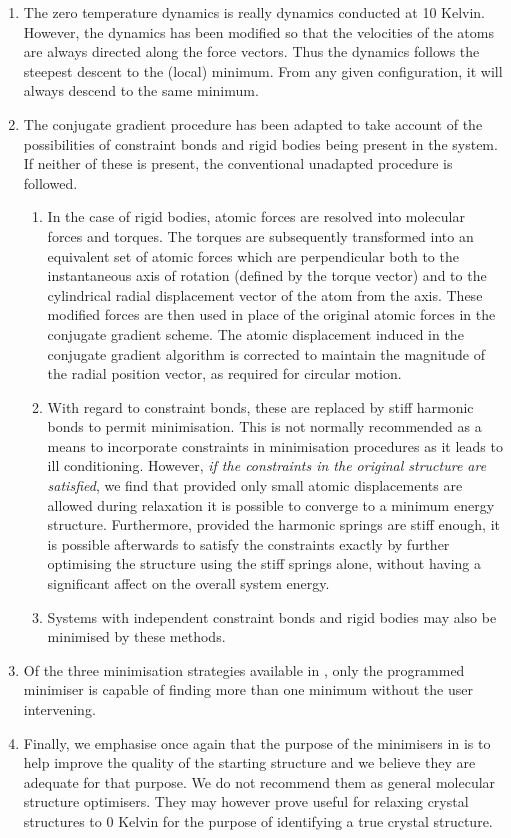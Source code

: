 \begin{enumerate}
\item The zero temperature dynamics is really dynamics conducted at 10
Kelvin.  However, the dynamics has been modified so that the velocities
of the atoms are always directed along the force vectors.  Thus the
dynamics follows the steepest descent to the (local) minimum.  From any
given configuration, it will always descend to the same minimum.

\item The conjugate gradient procedure has been adapted to take account
of the possibilities of constraint bonds and rigid bodies being present
in the system.  If neither of these is present, the conventional
unadapted procedure is followed.

\begin{enumerate}
\item In the case of rigid bodies, atomic forces are resolved into
molecular forces and torques.  The torques are subsequently transformed
into an equivalent set of atomic forces which are perpendicular both to
the instantaneous axis of rotation (defined by the torque vector) and
to the cylindrical radial displacement vector of the atom from the axis.
These modified forces are then used in place of the original atomic
forces in the conjugate gradient scheme.  The atomic displacement
induced in the conjugate gradient algorithm is corrected to maintain the
magnitude of the radial position vector, as required for circular motion.

\item With regard to constraint bonds, these are replaced by stiff
harmonic bonds to permit minimisation.  This is not normally recommended
as a means to incorporate constraints in minimisation procedures as it
leads to ill conditioning. However, {\it if the constraints in the
original structure are satisfied}, we find that provided only small
atomic displacements are allowed during relaxation it is possible to
converge to a minimum energy structure. Furthermore, provided the
harmonic springs are stiff enough, it is possible afterwards to satisfy
the constraints exactly by further optimising the structure using the
stiff springs alone, without having a significant affect on the overall
system energy.

\item Systems with independent constraint bonds and rigid bodies may
also be minimised by these methods.
\end{enumerate}

\item Of the three minimisation strategies available in \D, only the
programmed minimiser is capable of finding more than one minimum
without the user intervening.

\item Finally, we emphasise once again that the purpose of the
minimisers in \D is to help improve the quality of the starting
structure and we believe they are adequate for that purpose.  We do
not recommend them as general molecular structure optimisers.  They
may however prove useful for relaxing crystal structures to 0 Kelvin
for the purpose of identifying a true crystal structure.
\end{enumerate}

